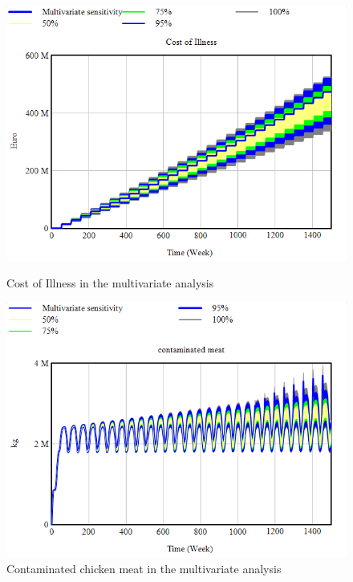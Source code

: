 
\begin{figure}[h!]
    \centering
    \begin{minipage}{0.45\textwidth}
        \centering
        \includegraphics[width=1\textwidth]{images/sensitivity/Multivariate COI.png} %
        \caption{Cost of Illness in the multivariate analysis}
        \label{fig:multi_coi}
    \end{minipage}\hfill
    \begin{minipage}{0.45\textwidth}
        \centering
        \includegraphics[width=1\textwidth]{images/sensitivity/Multivariate contaminated meat.png} %
        \caption{Contaminated chicken meat in the multivariate analysis}
        \label{fig:multi_meat}
    \end{minipage}
\end{figure}

